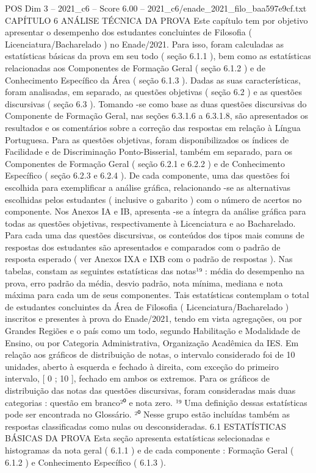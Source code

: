 \begin{textsample}{POS Dim 3 – 2021\_c6 – Score 6.00 – 2021\_c6/enade\_2021\_filo\_baa597e9cf.txt}  \label{ex:f3_pos_046}
CAPÍTULO 6 ANÁLISE TÉCNICA DA PROVA Este capítulo tem por objetivo apresentar o desempenho dos estudantes concluintes de Filosofia ( Licenciatura/Bacharelado ) no Enade/2021.
Para isso, foram calculadas as estatísticas básicas da prova em seu todo ( seção 6.1.1 ), bem como as estatísticas relacionadas aos Componentes de Formação Geral ( seção 6.1.2 ) e de Conhecimento Específico da Área ( seção 6.1.3 ).
Dadas as suas características, foram analisadas, em separado, as questões objetivas ( seção 6.2 ) e as questões discursivas ( seção 6.3 ).
Tomando -se como base as duas questões discursivas do Componente de Formação Geral, nas seções 6.3.1.6 a 6.3.1.8, são apresentados os resultados e os comentários sobre a correção das respostas em relação à Língua Portuguesa.
Para as questões objetivas, foram disponibilizados os índices de Facilidade e de Discriminação Ponto-Bisserial, também em separado, para os Componentes de Formação Geral ( seção 6.2.1 e 6.2.2 ) e de Conhecimento Específico ( seção 6.2.3 e 6.2.4 ).
De cada componente, uma das questões foi escolhida para exemplificar a análise gráfica, relacionando -se as alternativas escolhidas pelos estudantes ( inclusive o gabarito ) com o número de acertos no componente.
Nos Anexos IA e IB, apresenta -se a íntegra da análise gráfica para todas as questões objetivas, respectivamente à Licenciatura e ao Bacharelado.
Para cada uma das questões discursivas, os conteúdos dos tipos mais comuns de respostas dos estudantes são apresentados e comparados com o padrão de resposta esperado ( ver Anexos IXA e IXB com o padrão de respostas ).
Nas tabelas, constam as seguintes estatísticas das notas¹⁹ : média do desempenho na prova, erro padrão da média, desvio padrão, nota mínima, mediana e nota máxima para cada um de seus componentes.
Tais estatísticas contemplam o total de estudantes concluintes da Área de Filosofia ( Licenciatura/Bacharelado ) inscritos e presentes à prova do Enade/2021, tendo em vista agregações, ou por Grandes Regiões e o país como um todo, segundo Habilitação e Modalidade de Ensino, ou por Categoria Administrativa, Organização Acadêmica da IES.
Em relação aos gráficos de distribuição de notas, o intervalo considerado foi de 10 unidades, aberto à esquerda e fechado à direita, com exceção do primeiro intervalo, [ 0 ; 10 ], fechado em ambos os extremos.
Para os gráficos de distribuição das notas das questões discursivas, foram consideradas mais duas categorias : questão em branco²⁰ e nota zero. ¹⁹ Uma definição dessas estatísticas pode ser encontrada no Glossário. ²⁰ Nesse grupo estão incluídas também as respostas classificadas como nulas ou desconsideradas. 6.1 ESTATÍSTICAS BÁSICAS DA PROVA Esta seção apresenta estatísticas selecionadas e histogramas da nota geral ( 6.1.1 ) e de cada componente : Formação Geral ( 6.1.2 ) e Conhecimento Específico ( 6.1.3 ).

\end{textsample}
